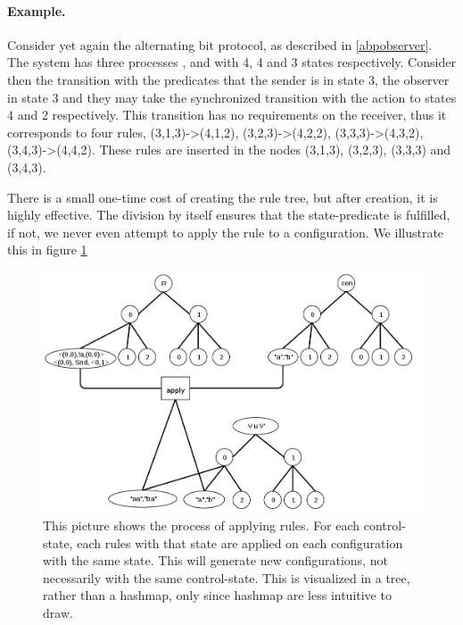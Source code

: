 \paragraph{Example.} Consider yet again the alternating bit protocol, as described in \ref{abpobserver}. The system has three processes ,  and  with 4, 4 and 3 states respectively. Consider then the transition with the predicates that the sender is in state 3, the observer in state 3 and they may take the synchronized transition with the action  to states 4 and 2 respectively. This transition has no requirements on the receiver, thus it corresponds to four rules, (3,1,3)->(4,1,2), (3,2,3)->(4,2,2), (3,3,3)->(4,3,2), (3,4,3)->(4,4,2). These rules are inserted in the nodes (3,1,3), (3,2,3), (3,3,3) and (3,4,3).

There is a small one-time cost of creating the rule tree, but after creation, it is highly effective. The division by itself ensures that the state-predicate is fulfilled, if not, we never even attempt to apply the rule to a configuration. We illustrate this in figure \ref{applyrule} 

\begin{figure}
\includegraphics[width=400pt] {bilder/applyrule.png}
\caption{This picture shows the process of applying rules. For each control-state, each rules with that state are applied on each configuration with the same state. This will generate new configurations, not necessarily with the same control-state. This is visualized in a tree, rather than a hashmap, only since hashmap are less intuitive to draw.}
\label{applyrule}
\end{figure}


